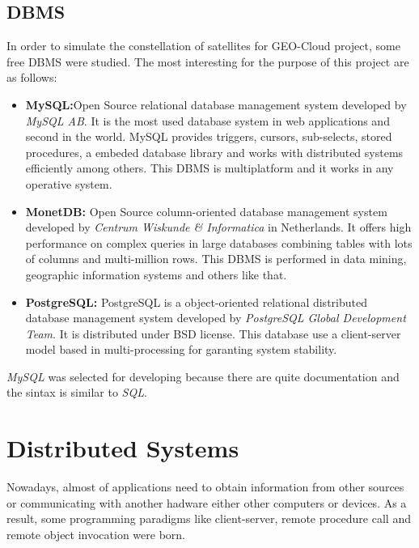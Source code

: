 \subsection{DBMS}

In order to simulate the constellation of satellites for GEO-Cloud project, some
free \ac{DBMS} were studied. The most interesting for the purpose of this project are
as follows:
\begin{itemize}
\item \textbf{MySQL:}Open Source relational database management system developed by
  \emph{MySQL AB}. It is the most used database system in web applications and
  second in the world. MySQL provides triggers, cursors, sub-selects, stored
  procedures, a embeded database library and works with distributed systems
  efficiently among others. This \ac{DBMS} is multiplatform and it works in any
  operative system. 
\item \textbf{MonetDB:} Open Source column-oriented database management system
  developed by \emph{Centrum Wiskunde \& Informatica} in Netherlands. It offers
  high performance on complex queries in large databases combining tables with
  lots of columns and multi-million rows. This \ac{DBMS} is performed in data
  mining, geographic information systems and others like that.
\item \textbf{PostgreSQL:} PostgreSQL is a object-oriented relational
  distributed database management system developed by \emph{PostgreSQL Global
    Development Team}. It is distributed under BSD license. This database use a
  client-server model based in multi-processing for garanting system stability.
\end{itemize} 

\emph{MySQL} was selected for developing because there are quite documentation and the
sintax is similar to \emph{SQL}.

\section{Distributed Systems}
Nowadays, almost of applications need to obtain information from other sources
or communicating with another hadware either other computers or devices. As a
result, some programming paradigms like client-server, remote procedure call and
remote object invocation were born.

